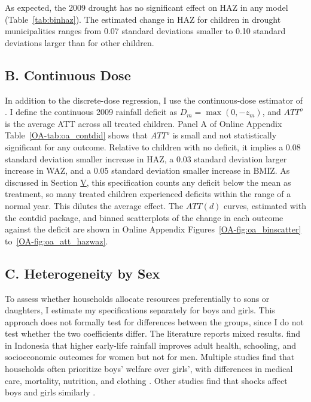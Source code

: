 \documentclass[12pt]{article}
\begin{document}
As expected, the 2009 drought has no significant effect on HAZ in any model (Table~\ref{tab:binhaz}). The estimated change in HAZ for children in drought municipalities ranges from 0.07 standard deviations smaller to 0.10 standard deviations larger than for other children.

\subsection*{B. Continuous Dose}

In addition to the discrete-dose regression, I use the continuous-dose estimator of \textcite{callawayDifferenceinDifferencesContinuousTreatment2024}. I define the continuous 2009 rainfall deficit as $D_m = \max(0, -z_m)$, and $ATT^o$ is the average ATT across all treated children. Panel A of Online Appendix Table~\ref{OA-tab:oa_contdid} shows that $ATT^o$ is small and not statistically significant for any outcome. Relative to children with no deficit, it implies a 0.08 standard deviation smaller increase in HAZ, a 0.03 standard deviation larger increase in WAZ, and a 0.05 standard deviation smaller increase in BMIZ. As discussed in Section \hyperref[sec:V]{V}, this specification counts any deficit below the mean as treatment, so many treated children experienced deficits within the range of a normal year. This dilutes the average effect. The $ATT(d)$ curves, estimated with the contdid package, and binned scatterplots of the change in each outcome against the deficit are shown in Online Appendix Figures~\ref{OA-fig:oa_binscatter} to~\ref{OA-fig:oa_att_hazwaz}.

\subsection*{C. Heterogeneity by Sex}

To assess whether households allocate resources preferentially to sons or daughters, I estimate my specifications separately for boys and girls. This approach does not formally test for differences between the groups, since I do not test whether the two coefficients differ. The literature reports mixed results. \textcite{macciniWeatherHealthSchooling2009} find in Indonesia that higher early-life rainfall improves adult health, schooling, and socioeconomic outcomes for women but not for men. Multiple studies find that households often prioritize boys' welfare over girls', with differences in medical care, mortality, nutrition, and clothing \parencite{dasguptaSelectiveDiscriminationFemale1987,behrmanIntrahouseholdAllocationNutrients1988,behrmanIntrahouseholdDemandNutrients1990,roseConsumptionSmoothingExcess1999,aldermanFamilyResourcesGender1997}. Other studies find that shocks affect boys and girls similarly \parencite{levineGenderBiasIndonesian2003}.
\end{document}
